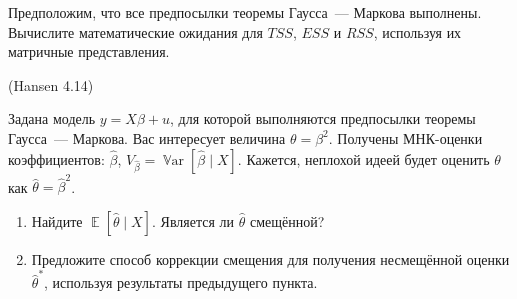 \documentclass[12pt]{article}
\DeclareMathOperator{\Var}{\mathbb{V}ar}
\DeclareMathOperator{\E}{\mathbb{E}}
\newcommand{\hb}{\hat{\beta}}
\newcommand{\RSS}{RSS}
\newcommand{\ESS}{ESS}
\newcommand{\TSS}{TSS}
\begin{document}
\begin{problem}
Предположим, что все предпосылки теоремы Гаусса~— Маркова выполнены. 
Вычислите математические ожидания для $\TSS$, $\ESS$ и $\RSS$, используя их матричные представления.
\begin{sol}
\end{sol}
\end{problem}

\begin{problem}(Hansen 4.14)

Задана модель $y = X \beta + u$, для которой выполняются предпосылки теоремы Гаусса~— Маркова. 
Вас интересует величина $\theta = \beta^2$. 
Получены МНК-оценки коэффициентов: $\hb$, $V_{\hb} = \Var [\hb \mid X]$. 
Кажется, неплохой идеей будет оценить $\theta$ как $\hat{\theta} = \hb^2$.

\begin{enumerate}
    \item Найдите $\E [\hat{\theta} \mid X]$. Является ли $\hat{\theta}$ смещённой?
    \item Предложите способ коррекции смещения для получения несмещённой оценки  $\hat{\theta}^*$, используя результаты предыдущего пункта.
\end{enumerate}

\begin{sol}
\end{sol}

\end{problem}
\end{document}

